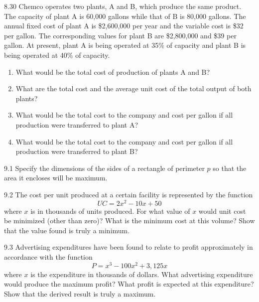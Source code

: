 \begin{exsol@exercise}{8.30}
    \label{sea-8-30}
        Chemco operates two plants, A and B, which produce the same product. The capacity of plant A is 60,000 gallons while that of B is 80,000 gallons. The annual fixed cost of plant A is \$2,600,000 per year and the variable cost is \$32 per gallon. The corresponding values for plant B are \$2,800,000 and \$39 per gallon. At present, plant A is being operated at 35\% of capacity and plant B is being operated at 40\% of capacity.
        \begin{enumerate}[label=\alph*)]
            \item What would be the total cost of production of plants A and B?
            \item What are the total cost and the average unit cost of the total output of both plants?
            \item What would be the total cost to the company and cost per gallon if all production were transferred to plant A?
            \item What would be the total cost to the company and cost per gallon if all production were transferred to plant B?
        \end{enumerate}
\end{exsol@exercise}
\begin{exsol@solution}{}
\end{exsol@solution}
\begin{exsol@exercise}{9.1}
    \label{sea-9-1}
        Specify the dimensions of the sides of a rectangle of perimeter $p$ so that the area it encloses will be maximum.
\end{exsol@exercise}
\begin{exsol@solution}{}
\end{exsol@solution}
\begin{exsol@exercise}{9.2}
    \label{sea-9-2}
        The cost per unit produced at a certain facility is represented by the function
        \begin{equation}
            UC = 2x^2-10x+50
        \end{equation}
        where $x$ is in thousands of units produced. For what value of $x$ would unit cost be minimized (other than zero)? What is the minimum cost at this volume? Show that the value found is truly a minimum.
\end{exsol@exercise}
\begin{exsol@solution}{}
\end{exsol@solution}
\begin{exsol@exercise}{9.3}
    \label{sea-9-3}
        Advertising expenditures have been found to relate to profit approximately in accordance with the function
        \begin{equation}
            P = x^3-100x^2+3,125x
        \end{equation}
        where $x$ is the expenditure in thousands of dollars. What advertising expenditure would produce the maximum profit? What profit is expected at this expenditure? Show that the derived result is truly a maximum.
\end{exsol@exercise}
